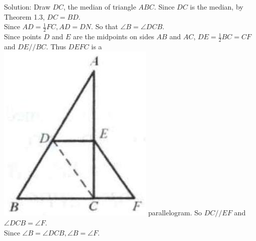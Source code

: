 \documentclass{article}
\begin{document}
Solution:
Draw \(D C\), the median of triangle \(A B C\). Since \(D C\) is the median, by Theorem 1.3, \(D C=B D\).\\
Since \(A D=\frac{1}{2} F C, A D=D N\). So that \(\angle B=\angle D C B\).\\
Since points \(D\) and \(E\) are the midpoints on sides \(A B\) and \(A C\), \(D E=\frac{1}{2} B C=C F\) and \(D E / / B C\). Thus \(D E F C\) is a\\
\includegraphics[width=\textwidth]{images/reasoning_image_1.jpg} parallelogram. So \(D C / / E F\) and \(\angle D C B=\angle F\).\\
Since \(\angle B=\angle D C B, \angle B=\angle F\).
\end{document}
